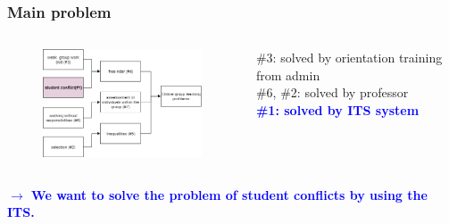 \documentclass{beamer}
\begin{document}
\begin{frame}
\frametitle{ Main problem}

\begin{columns}
	\begin{column}{.55\textwidth}
	\begin{figure}
		\includegraphics[width=65mm]{p22.png}
	\end{figure}
	\end{column}
\begin{column}{.35\textwidth}
	\#3: solved by orientation training from admin \\
	\#6, \#2: solved by professor\\
	\textcolor{blue}{\textbf{\#1: solved by ITS system}}
\end{column}
\end{columns}
\begin{flushleft}
	
\end{flushleft}



\textcolor{blue}{\textbf{$\rightarrow$	We want to solve the problem of student conflicts by using the ITS. }}







\end{frame}
\end{document}
